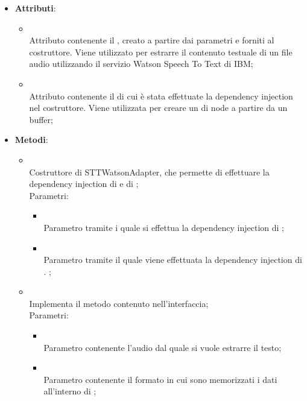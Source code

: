 \begin{itemize}
\begin{itemize}
\end{itemize};
	\item \textbf{Attributi}:
	\begin{itemize}
		\item[]  \\
		Attributo contenente il , creato a partire dai parametri  e  forniti al costruttore. Viene utilizzato per estrarre il contenuto testuale di un file audio utilizzando il servizio Watson Speech To Text di IBM;
		\item[]  \\
		Attributo contenente il  di cui è stata effettuate la dependency injection nel costruttore. Viene utilizzata per creare un  di node a partire da un buffer;
	\end{itemize}
	\item \textbf{Metodi}:
	\begin{itemize}
		\item[]  \\
		Costruttore di STTWatsonAdapter, che permette di effettuare la dependency injection di  e di ;\\
		Parametri:
		\begin{itemize}
			\item {} \\
			Parametro tramite i quale si effettua la dependency injection di ;
			\item {} \\
			Parametro tramite il quale viene effettuata la dependency injection di . ;
		\end{itemize}
		\item[]  \\
			Implementa il metodo  contenuto nell'interfaccia;\\
		Parametri:
		\begin{itemize}
			\item {} \\
			Parametro contenente l'audio dal quale si vuole estrarre il testo;
			\item {} \\
			Parametro contenente il formato in cui sono memorizzati i dati all'interno di ;
		\end{itemize}
	\end{itemize}
\end{itemize}
\FloatBarrier

